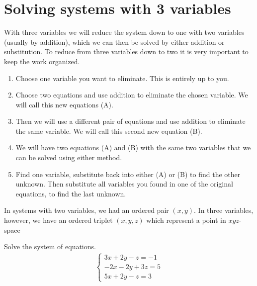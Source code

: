 \section{Solving systems with 3 variables}
With three variables we will reduce the system down to one with two variables (usually by addition), which we can then be solved by either addition or substitution. To reduce from three variables down to two it is very important to keep the work organized. 
\vspace{0.5cm}

%
	\begin{tcolorbox}[title=Solve a system with three variables, 
	                  fonttitle=\bfseries,
	                  colframe=blue!70!black,
	                  colback=white]
	\begin{enumerate}
	    \item Choose one variable you want to eliminate. This is entirely up to you.
	    \item Choose two equations and use addition to eliminate the chosen variable. We will call this new equations (A). 
    	\item Then we will use a different pair of equations and use addition to eliminate the same variable. We will call this second new equation (B). 
	    \item We will have two equations (A) and (B) with the same two variables that we can be solved using either method. 
	    \item Find one variable, substitute back into either (A) or (B) to find the other unknown. Then substitute all variables you found in one of the original equations, to find the last unknown.
	\end{enumerate}
	\end{tcolorbox}
%
\vspace{.5cm}


\begin{note}
	In systems with two variables, we had an ordered pair $(x,y)$. In three variables, however, we have an ordered triplet $(x,y,z)$ which represent a point in $xyz$-space
\end{note}
\vspace{.3cm}
%
\begin{example}
	Solve the system of equations.
		\begin{align*}
		\begin{cases}
			3x+2y-z=-1\\
			-2x-2y+3z=5\\
			5x+2y-z=3
		\end{cases}
	\end{align*}
\end{example}
%
\vspace{0.6cm}

